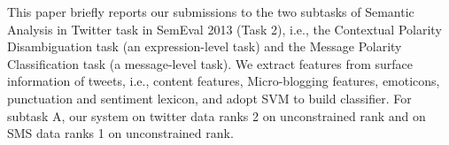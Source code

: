 This paper briefly reports our submissions to the two subtasks of Semantic Analysis in Twitter task in SemEval 2013 (Task 2), i.e., the Contextual
 Polarity Disambiguation task (an expression-level task) and the Message
 Polarity Classification task (a message-level task). We extract features from
 surface information of tweets, i.e., content features, Micro-blogging features,
 emoticons, punctuation and sentiment lexicon, and adopt SVM to build
 classifier. For subtask A, our system on twitter data ranks 2 on unconstrained
 rank and on SMS data ranks 1 on unconstrained rank.

